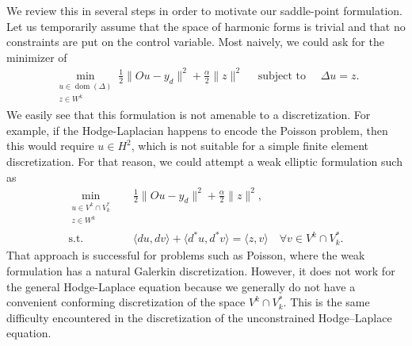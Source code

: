 \documentclass{article}
\begin{document}
We review this in several steps in order to motivate our saddle-point formulation. Let us temporarily assume that the space of harmonic forms is trivial and that no constraints are put on the control variable. Most naively, we could ask for the minimizer of
\begin{gather} 
	\min_{ \substack{ u \in \operatorname{dom}(\Delta) \\ z \in W^k } }
	\frac{1}{2} \| O u - y_d \|^{2} + \frac \alpha 2 \| z \|^{2}
	\quad
	\text{ subject to }
	\quad
	\Delta u = z.
\end{gather}
We easily see that this formulation is not amenable to a discretization. For example, if the Hodge-Laplacian happens to encode the Poisson problem, then this would require $u \in H^2$, which is not suitable for a simple finite element discretization.
For that reason, we could attempt a weak elliptic formulation such as
\begin{align*}
\min_{\substack{u \in V^k \cap V_k^\ast \\ z \in W^k}}
\quad &
\frac{1}{2}\|Ou-y_d\|^2+\frac{\alpha}{2}\|z\|^2,
\\
\text{s.t.}\quad &
\langle du,dv\rangle+\langle d^\ast u,d^\ast v\rangle
=\langle z,v\rangle
\quad
\forall v\in V^k\cap V_k^\ast .
\end{align*}
That approach is successful for problems such as Poisson, where the weak formulation has a natural Galerkin discretization.
However, it does not work for the general Hodge-Laplace equation
because we generally do not have a convenient conforming discretization of the space $V^k \cap V^\ast_k$. This is the same difficulty encountered in the discretization of the unconstrained Hodge--Laplace equation.


\end{document}
